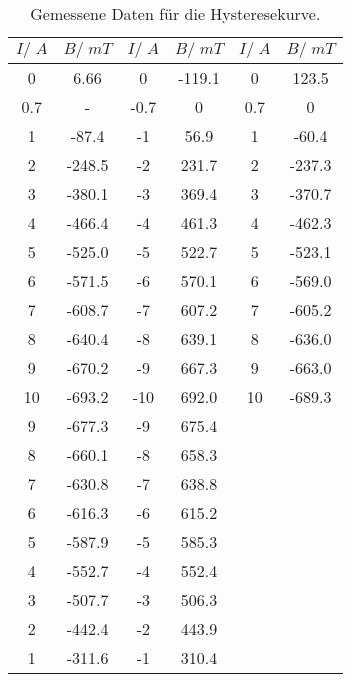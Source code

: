 \begin{table}[H]
  \centering
   \begin{tabular}{c c| c c| c c}
    \toprule
    $I /\;\si{A}$ & $ B/\;\si{mT}$ & $I /\;\si{A}$ & $ B/\;\si{mT}$ &
    $I /\;\si{A}$ & $ B/\;\si{mT}$\\
    \midrule
    0 & 6.66 & 0 & -119.1 & 0 & 123.5 \\
    0.7 & - & -0.7 & 0 &  0.7 & 0 \\
    1 & -87.4 & -1 & 56.9 & 1 & -60.4 \\
    2 & -248.5 & -2 & 231.7 & 2 & -237.3 \\
    3 & -380.1 & -3 & 369.4 & 3 & -370.7 \\
    4 & -466.4 & -4 & 461.3 & 4 & -462.3 \\
    5 & -525.0 & -5 & 522.7 & 5 & -523.1 \\
    6 & -571.5 & -6 & 570.1 & 6 & -569.0 \\
    7 & -608.7 & -7 & 607.2 & 7 & -605.2 \\
    8 & -640.4 & -8 & 639.1 & 8 & -636.0 \\
    9 & -670.2 & -9 & 667.3 & 9 & -663.0 \\
    10 & -693.2 & -10 & 692.0 & 10 & -689.3 \\
    9 & -677.3 &  -9 & 675.4 &  & \\
    8 & -660.1 & -8 & 658.3 &  &  \\
    7 & -630.8 &  -7 & 638.8 & &  \\
    6 & -616.3 & -6 & 615.2 &  &  \\
    5 & -587.9 & -5 & 585.3 &  &  \\
    4 & -552.7 & -4 & 552.4 &  &  \\
    3 & -507.7 & -3 & 506.3 &  &  \\
    2 & -442.4 & -2 & 443.9 &  &  \\
    1 & -311.6 & -1 & 310.4 &  &  \\
    \bottomrule
  \end{tabular}
  \caption{Gemessene Daten für die Hysteresekurve.}
  \label{tab:tabelle1}
\end{table}
